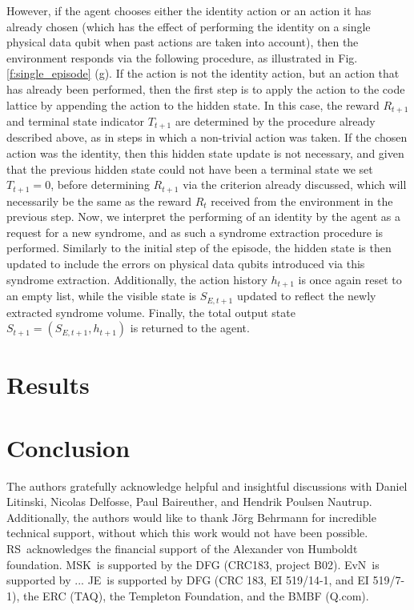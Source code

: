 \documentclass[twocolumn,preprintnumbers,amsmath,amssymb,notitlepage,nofootinbib,longbibliography,superscriptaddress,aps,pra,10pt]{revtex4-1}
\begin{document}
    However, if the agent chooses either the identity action or an action it has already chosen (which has the effect of performing the identity on a single physical data qubit when past actions are taken into account), then the environment responds via the following procedure, as illustrated in Fig. \ref{f:single_episode} (g).
    If the action is not the identity action, but an action that has already been performed, then the first step is to apply the action to the code lattice by appending the action to the hidden state. 
    In this case, the reward $R_{t+1}$ and terminal state indicator $T_{t+1}$ are determined by the procedure already described above, as in steps in which a non-trivial action was taken.
    If the chosen action was the identity, then this hidden state update is not necessary, and given that the previous hidden state could not have been a terminal state we set $T_{t+1} = 0$, before determining $R_{t+1}$ via the criterion already discussed, which will necessarily be the same as the reward $R_t$ received from the environment in the previous step. 
    Now, we interpret the performing of an identity by the agent as a request for a new syndrome, and as such a syndrome extraction procedure is performed.
    Similarly to the initial step of the episode, the hidden state is then updated to include the errors on physical data qubits introduced via this syndrome extraction.
    Additionally, the action history $h_{t+1}$ is once again reset to an empty list, while the visible state is $S_{E,t+1}$ updated to reflect the newly extracted syndrome volume.
    Finally, the total output state $S_{t+1} = (S_{E,t+1},h_{t+1})$ is returned to the agent.








\section{Results}\label{s:results}
\section{Conclusion}\label{s:conclusions}


\begin{acknowledgments}
	The authors gratefully acknowledge helpful and insightful discussions with Daniel Litinski, Nicolas Delfosse, Paul Baireuther, and Hendrik Poulsen Nautrup.
	Additionally, the authors would like to thank J\"{o}rg Behrmann for incredible technical support, without which this work would not have been possible.
	RS\ acknowledges the financial support of the Alexander von Humboldt foundation.
	MSK\ is supported by the DFG (CRC183, project B02).
	EvN\ is supported by ...
	JE\ is supported by DFG (CRC 183, EI 519/14-1, and EI 519/7-1), the ERC (TAQ), the Templeton Foundation, and the BMBF (Q.com).
\end{acknowledgments}


\end{document}

